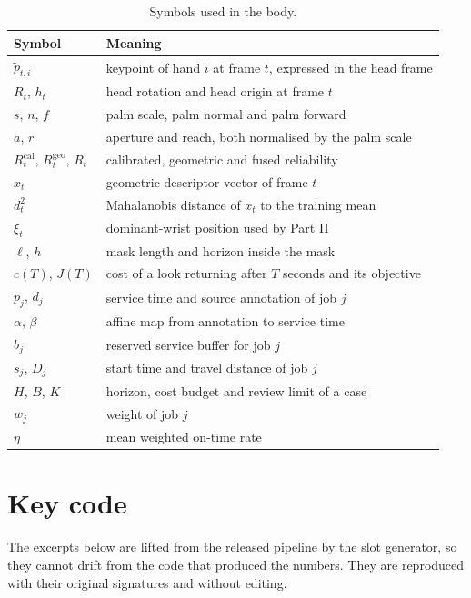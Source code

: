 \documentclass{swmcmthesis}
\begin{document}
\begin{appendices}
\begin{table}[htbp]
\centering
\caption{Symbols used in the body.}
\footnotesize
\begin{tabular}{ll}
\toprule
Symbol & Meaning \\
\midrule
$\tilde p_{t,i}$ & keypoint of hand $i$ at frame $t$, expressed in the head frame \\
$R_t$, $h_t$ & head rotation and head origin at frame $t$ \\
$s$, $n$, $f$ & palm scale, palm normal and palm forward \\
$a$, $r$ & aperture and reach, both normalised by the palm scale \\
$R^{\mathrm{cal}}_t$, $R^{\mathrm{geo}}_t$, $R_t$ & calibrated, geometric and fused reliability \\
$x_t$ & geometric descriptor vector of frame $t$ \\
$d_t^{2}$ & Mahalanobis distance of $x_t$ to the training mean \\
$\xi_t$ & dominant-wrist position used by Part II \\
$\ell$, $h$ & mask length and horizon inside the mask \\
$c(T)$, $J(T)$ & cost of a look returning after $T$ seconds and its objective \\
$p_j$, $d_j$ & service time and source annotation of job $j$ \\
$\alpha$, $\beta$ & affine map from annotation to service time \\
$b_j$ & reserved service buffer for job $j$ \\
$s_j$, $D_j$ & start time and travel distance of job $j$ \\
$H$, $B$, $K$ & horizon, cost budget and review limit of a case \\
$w_j$ & weight of job $j$ \\
$\eta$ & mean weighted on-time rate \\
\bottomrule
\end{tabular}
\end{table}

\section{Key code}
\label{app:code}

The excerpts below are lifted from the released pipeline by the slot generator, so
they cannot drift from the code that produced the numbers. They are reproduced with
their original signatures and without editing.


\end{appendices}
\end{document}

